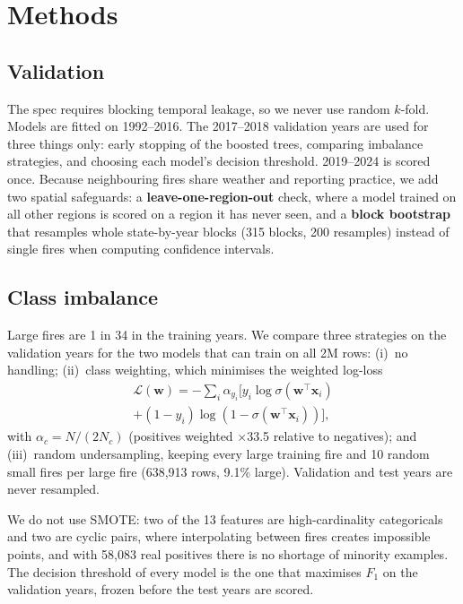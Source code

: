 \documentclass[10pt,twocolumn,letterpaper]{article}
\begin{document}
\section{Methods}
\subsection{Validation}
The spec requires blocking temporal leakage, so we never use random $k$-fold. Models are fitted on 1992--2016. The 2017--2018 validation years are used for three things only: early stopping of the boosted trees, comparing imbalance strategies, and choosing each model's decision threshold. 2019--2024 is scored once. Because neighbouring fires share weather and reporting practice, we add two spatial safeguards: a \textbf{leave-one-region-out} check, where a model trained on all other regions is scored on a region it has never seen, and a \textbf{block bootstrap} that resamples whole state-by-year blocks (315 blocks, 200 resamples) instead of single fires when computing confidence intervals.

\subsection{Class imbalance}
Large fires are 1 in 34 in the training years. We compare three strategies on the validation years for the two models that can train on all 2M rows: (i)~no handling; (ii)~class weighting, which minimises the weighted log-loss
\begin{multline}
\mathcal{L}(\mathbf{w}) = -\sum_{i} \alpha_{y_i}\big[y_i\log\sigma(\mathbf{w}^\top\mathbf{x}_i)\\
+ (1-y_i)\log(1-\sigma(\mathbf{w}^\top\mathbf{x}_i))\big],
\end{multline}
with $\alpha_c = N/(2N_c)$ (positives weighted $\times$33.5 relative to negatives); and (iii)~random undersampling, keeping every large training fire and 10 random small fires per large fire (638{,}913 rows, 9.1\% large). Validation and test years are never resampled.

We do not use SMOTE: two of the 13 features are high-cardinality categoricals and two are cyclic pairs, where interpolating between fires creates impossible points, and with 58{,}083 real positives there is no shortage of minority examples. The decision threshold of every model is the one that maximises $F_1$ on the validation years, frozen before the test years are scored.
\end{document}
